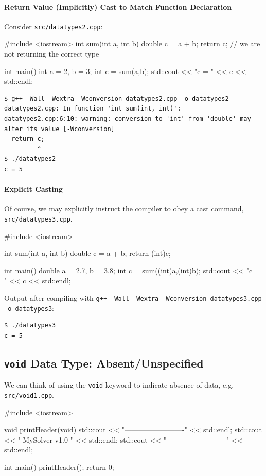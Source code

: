 \documentclass[12pt,letterpaper,twoside]{article}
\begin{document}
\paragraph{Return Value (Implicitly) Cast to Match Function Declaration}
Consider \texttt{src/datatypes2.cpp}:

\begin{cpp}
#include <iostream>
int sum(int a, int b) {
  double c = a + b;
  return c; // we are not returning the correct type
}

int main() {
  int a = 2, b = 3;
  int c = sum(a,b);
  std::cout << "c = " << c << std::endl;
}
\end{cpp}

{\small
\begin{verbatim}
$ g++ -Wall -Wextra -Wconversion datatypes2.cpp -o datatypes2
datatypes2.cpp: In function 'int sum(int, int)':
datatypes2.cpp:6:10: warning: conversion to 'int' from 'double' may alter its value [-Wconversion]
  return c;
         ^
$ ./datatypes2
c = 5
\end{verbatim}
}

\paragraph{Explicit Casting} Of course, we may explicitly instruct the compiler to obey
a cast command,
\texttt{src/datatypes3.cpp}.

\begin{cpp}
#include <iostream>

int sum(int a, int b) {
  double c = a + b;
  return (int)c;
}

int main() {
  double a = 2.7, b = 3.8;
  int c = sum((int)a,(int)b);
  std::cout << "c = " << c << std::endl;
}
\end{cpp}

Output after compiling with \texttt{g++ -Wall -Wextra -Wconversion datatypes3.cpp -o datatypes3}:

{\small
\begin{verbatim}
$ ./datatypes3
c = 5
\end{verbatim}
}

\subsection{\texttt{void} Data Type: Absent/Unspecified}
We can think of using the \texttt{void} keyword to indicate absence of data, e.g.
\texttt{src/void1.cpp}.

\begin{cpp}
#include <iostream>

void printHeader(void) {
  std::cout << "-------------------------" << std::endl;
  std::cout << "      MySolver v1.0      " << std::endl;
  std::cout << "-------------------------" << std::endl;
}

int main() {
  printHeader();
  return 0;
}
\end{cpp}
\end{document}
